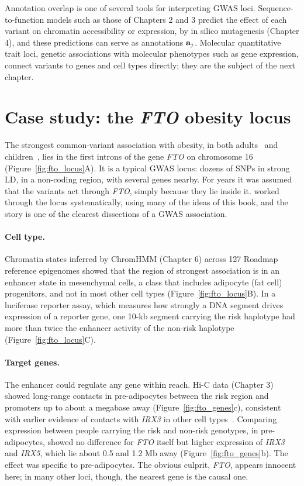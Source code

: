 Annotation overlap is one of several tools for interpreting GWAS loci. Sequence-to-function models such as those of Chapters 2 and 3 predict the effect of each variant on chromatin accessibility or expression, by in silico mutagenesis (Chapter 4), and these predictions can serve as annotations $\mathbf{a}_j$. Molecular quantitative trait loci, genetic associations with molecular phenotypes such as gene expression, connect variants to genes and cell types directly; they are the subject of the next chapter.

\section{Case study: the \textit{FTO} obesity locus}
\label{sec:fto}

The strongest common-variant association with obesity, in both adults~\citep{frayling2007} and children~\citep{bradfield2012}, lies in the first introns of the gene \textit{FTO} on chromosome 16 (Figure~\ref{fig:fto_locus}A). It is a typical GWAS locus: dozens of SNPs in strong LD, in a non-coding region, with several genes nearby. For years it was assumed that the variants act through \textit{FTO}, simply because they lie inside it. \citet{claussnitzer2015} worked through the locus systematically, using many of the ideas of this book, and the story is one of the clearest dissections of a GWAS association.

\paragraph{Cell type.} Chromatin states inferred by ChromHMM (Chapter 6) across 127 Roadmap reference epigenomes showed that the region of strongest association is in an enhancer state in mesenchymal cells, a class that includes adipocyte (fat cell) progenitors, and not in most other cell types (Figure~\ref{fig:fto_locus}B). In a luciferase reporter assay, which measures how strongly a DNA segment drives expression of a reporter gene, one 10-kb segment carrying the risk haplotype had more than twice the enhancer activity of the non-risk haplotype (Figure~\ref{fig:fto_locus}C).

\paragraph{Target genes.} The enhancer could regulate any gene within reach. Hi-C data (Chapter 3) showed long-range contacts in pre-adipocytes between the risk region and promoters up to about a megabase away (Figure~\ref{fig:fto_genes}c), consistent with earlier evidence of contacts with \textit{IRX3} in other cell types~\citep{smemo2014}. Comparing expression between people carrying the risk and non-risk genotypes, in pre-adipocytes, showed no difference for \textit{FTO} itself but higher expression of \textit{IRX3} and \textit{IRX5}, which lie about 0.5 and 1.2 Mb away (Figure~\ref{fig:fto_genes}b). The effect was specific to pre-adipocytes. The obvious culprit, \textit{FTO}, appears innocent here; in many other loci, though, the nearest gene is the causal one.

